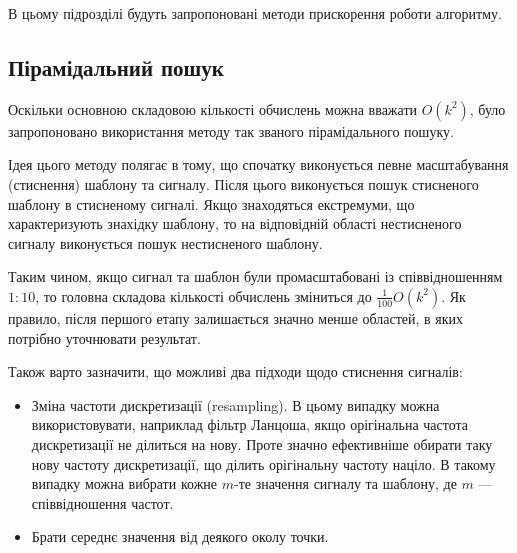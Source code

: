    В цьому підрозділі будуть запропоновані методи прискорення роботи алгоритму.

    \subsection{Пірамідальний пошук}
        Оскільки основною складовою кількості обчислень можна вважати $O(k^2)$, було запропоновано використання методу
        так званого пірамідального пошуку.

        Ідея цього методу полягає в тому, що спочатку виконується певне масштабування (стиснення) шаблону та сигналу.
        Після цього виконується пошук стисненого шаблону в стисненому сигналі.
        Якщо знаходяться екстремуми, що характеризують знахідку шаблону, то на відповідній області нестисненого
        сигналу виконується пошук нестисненого шаблону.

        Таким чином, якщо сигнал та шаблон були промасштабовані із співвідношенням $1:10$, то головна складова
        кількості обчислень зміниться до $\frac{1}{100} O(k^2)$.
        Як правило, після першого етапу залишається значно менше областей, в яких потрібно уточнювати результат.

        Також варто зазначити, що можливі два підходи щодо стиснення сигналів:
        \begin{itemize}
            \item Зміна частоти дискретизації (resampling).
                В цьому випадку можна використовувати, наприклад фільтр Ланцоша, якщо орігінальна частота
                дискретизації не ділиться на нову.
                Проте значно ефективніше обирати таку нову частоту дискретизації, що ділить орігінальну частоту
                націло.
                В такому випадку можна вибрати кожне $m$-те значення сигналу та шаблону, де $m$ --- співвідношення
                частот.
            \item Брати середнє значення від деякого околу точки.
        \end{itemize}
